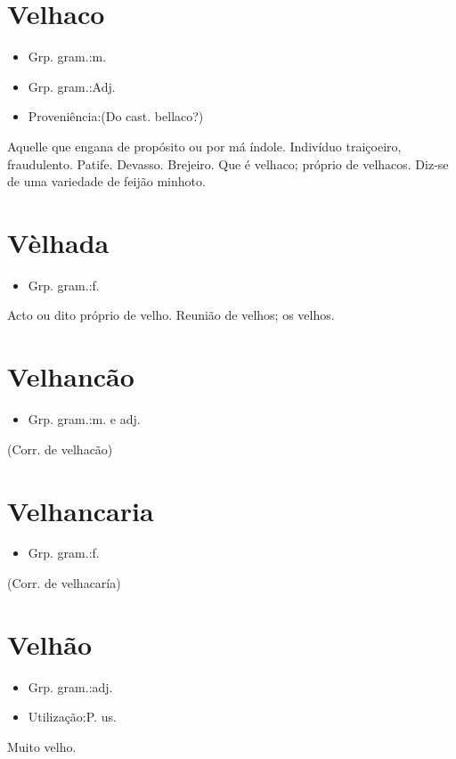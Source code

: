 \documentclass{article}
\begin{document}
\section{Velhaco}
\begin{itemize}
\item {Grp. gram.:m.}
\end{itemize}
\begin{itemize}
\item {Grp. gram.:Adj.}
\end{itemize}
\begin{itemize}
\item {Proveniência:(Do cast. \textunderscore bellaco\textunderscore ?)}
\end{itemize}
Aquelle que engana de propósito ou por má índole.
Indivíduo traiçoeiro, fraudulento.
Patife.
Devasso.
Brejeiro.
Que é velhaco; próprio de velhacos.
Diz-se de uma variedade de feijão minhoto.
\section{Vèlhada}
\begin{itemize}
\item {Grp. gram.:f.}
\end{itemize}
Acto ou dito próprio de velho.
Reunião de velhos; os velhos.
\section{Velhancão}
\begin{itemize}
\item {Grp. gram.:m.  e  adj.}
\end{itemize}
(Corr. de \textunderscore velhacão\textunderscore )
\section{Velhancaria}
\begin{itemize}
\item {Grp. gram.:f.}
\end{itemize}
(Corr. de \textunderscore velhacaría\textunderscore )
\section{Velhão}
\begin{itemize}
\item {Grp. gram.:adj.}
\end{itemize}
\begin{itemize}
\item {Utilização:P. us.}
\end{itemize}
Muito velho.
\end{document}

